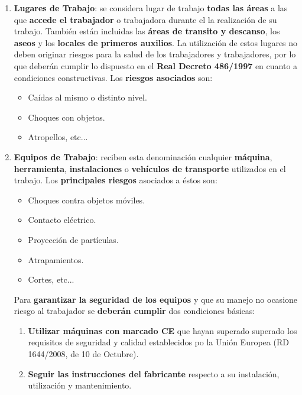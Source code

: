 \begin{enumerate}
    \item \textbf{Lugares de Trabajo}: se considera lugar de trabajo \textbf{todas las áreas} a las que \textbf{accede el trabajador} o trabajadora durante el la realización de su trabajo. También están incluidas las \textbf{áreas de transito y descanso}, los \textbf{aseos} y los \textbf{locales de primeros auxilios}. La utilización de estos lugares no deben originar riesgos para la salud de los trabajadores y trabajadores, por lo que deberán cumplir lo dispuesto en el \textbf{Real Decreto 486/1997} en cuanto a condiciones constructivas. Los \textbf{riesgos asociados} son:
    \begin{itemize}
        \item Caídas al mismo o distinto nivel.
        \item Choques con objetos.
        \item Atropellos, etc...
    \end{itemize}

    \item \textbf{Equipos de Trabajo}: reciben esta denominación cualquier \textbf{máquina}, \textbf{herramienta}, \textbf{instalaciones} o \textbf{vehículos de transporte} utilizados en el trabajo. Los \textbf{principales riesgos} asociados a éstos son:
    \begin{itemize}
        \item Choques contra objetos móviles.
        \item Contacto eléctrico.
        \item Proyección de partículas.
        \item Atrapamientos.
        \item Cortes, etc...
    \end{itemize}

    Para \textbf{garantizar la seguridad de los equipos} y que su manejo no ocasione riesgo al trabajador se \textbf{deberán cumplir} dos condiciones básicas:

    \begin{enumerate}[label=\alph*)]
        \item \textbf{Utilizar máquinas con marcado CE} que hayan superado superado los requisitos de seguridad y calidad establecidos po la Unión Europea (RD 1644/2008, de 10 de Octubre).
        \item \textbf{Seguir las instrucciones del fabricante} respecto a su instalación, utilización y mantenimiento.
    \end{enumerate}


\end{enumerate}

